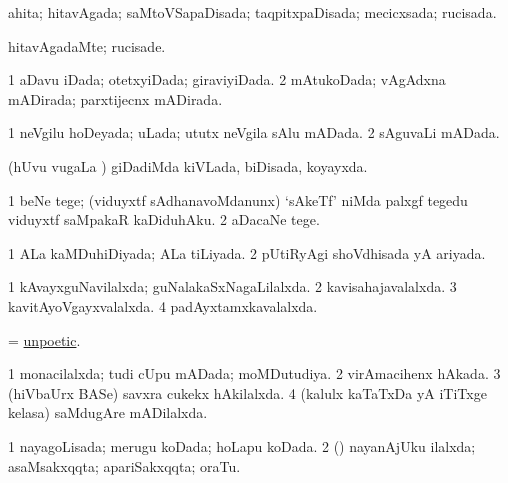 \bentry
{} 
\gl{\gu}
\expl{}
\bmng
ahita; hitavAgada; saMtoVSapaDisada; taqpitxpaDisada; mecicxsada; rucisada. 
\emng
\eentry

\bentry
{} 
\gl{\kirxvi}
\expl{}
\bmng
hitavAgadaMte; rucisade. 
\emng
\eentry

\bentry
{} 
\gl{\gu}
\expl{}
\bmng
\bnum
\num{1} aDavu iDada; otetxyiDada; giraviyiDada. 
\num{2} mAtukoDada; vAgAdxna mADirada; parxtijecnx mADirada. 
\enum
\emng
\eentry

\bentry
{} 
\gl{\gu}
\expl{}
\bmng
\bnum
\num{1} neVgilu hoDeyada; uLada; ututx neVgila sAlu mADada. 
\num{2} sAguvaLi mADada. 
\enum
\emng
\eentry

\bentry
{} 
\gl{\gu}
\expl{}
\bmng
(hUvu \mo vugaLa \vi) giDadiMda kiVLada, biDisada, koyayxda. 
\emng
\eentry

\bentry
{} 
\gl{\sakirx}
\bmng
\bnum
\num{1} beNe tege; (viduyxtf sAdhanavoMdanunx) `sAkeTf' niMda palxgf tegedu viduyxtf saMpakaR kaDiduhAku. 
\num{2} aDacaNe tege. 
\enum
\emng
\eentry

\bentry
{} 
\gl{\gu}
\expl{}
\bmng
\bnum
\num{1} ALa kaMDuhiDiyada; ALa tiLiyada. 
\num{2} pUtiRyAgi shoVdhisada yA ariyada. 
\enum
\emng
\eentry

\bentry
{} 
\gl{\gu}
\expl{}
\bmng
\bnum
\num{1} kAvayxguNavilalxda; guNalakaSxNagaLilalxda. 
\num{2} kavisahajavalalxda. 
\num{3} kavitAyoVgayxvalalxda. 
\num{4} padAyxtamxkavalalxda. 
\enum
\emng
\eentry

\bentry
{} 
\gl{\gu}
\expl{}
\bmng
= \hyperlink{unpoetic}{unpoetic}. 
\emng
\eentry

\bentry
{} 
\gl{\gu}
\expl{}
\bmng
\bnum
\num{1} monacilalxda; tudi cUpu mADada; moMDutudiya. 
\num{2} virAmacihenx hAkada. 
\num{3} (hiVbaUrx BASe) savxra cukekx hAkilalxda. 
\num{4} (kalulx kaTaTxDa yA iTiTxge kelasa) saMdugAre mADilalxda. 
\enum
\emng
\eentry

\bentry 
{} 
\gl{\gu}
\expl{}
\bmng
\bnum
\num{1} nayagoLisada; merugu koDada; hoLapu koDada. 
\num{2} (\rUpa) nayanAjUku ilalxda; asaMsakxqqta; apariSakxqqta; oraTu. 
\enum
\emng
\eentry

